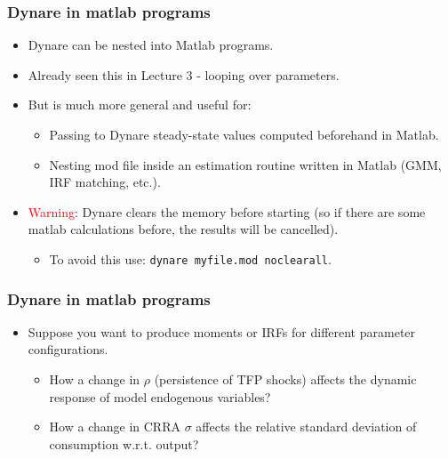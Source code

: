 \documentclass{beamer}
\begin{document}
\begin{frame}
\frametitle{Dynare in matlab programs}

\begin{itemize}
\item Dynare can be nested into Matlab programs.

\item Already seen this in Lecture 3 - looping over parameters.

\item But is much more general and useful for:

\begin{itemize}
\item Passing to Dynare steady-state values computed beforehand in Matlab.

\item Nesting mod file inside an estimation routine written in Matlab (GMM,
IRF matching, etc.).
\end{itemize}

\item \textcolor{red}{Warning}: Dynare clears the memory before starting (so if there are
some matlab calculations before, the results will be cancelled). 
\begin{itemize}
	\item To avoid this use:
	\texttt{dynare myfile.mod noclearall}.
\end{itemize}

\end{itemize}

\end{frame}

\begin{frame}%
\frametitle{Dynare in matlab programs}

\begin{itemize}
\item Suppose you want to produce moments or IRFs for different parameter configurations.
\medskip
\begin{itemize}
	\item How a change in $ \rho $ (persistence of TFP shocks) affects the dynamic response of model endogenous variables?
	\medskip
	\item How a change in CRRA $ \sigma $ affects the relative standard deviation of consumption w.r.t. output?
\end{itemize}

\end{itemize}

\end{frame}
\end{document}
